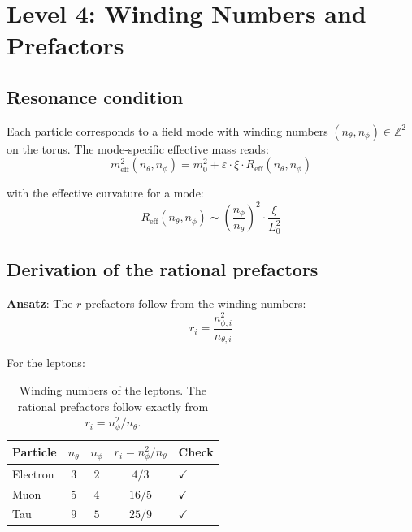 \section{Level 4: Winding Numbers and Prefactors}

\subsection{Resonance condition}

Each particle corresponds to a field mode with winding numbers
$(n_\theta, n_\phi) \in \mathbb{Z}^2$ on the torus. The
mode-specific effective mass reads:
\begin{equation}
    m_{\mathrm{eff}}^2(n_\theta, n_\phi)
    = m_0^2 + \varepsilon \cdot \xi \cdot R_{\mathrm{eff}}(n_\theta, n_\phi)
\end{equation}

with the effective curvature for a mode:
\begin{equation}
    R_{\mathrm{eff}}(n_\theta, n_\phi)
    \sim \left(\frac{n_\phi}{n_\theta}\right)^2 \cdot \frac{\xi}{L_0^2}
\end{equation}

\subsection{Derivation of the rational prefactors}

\textbf{Ansatz}: The $r$ prefactors follow from the winding numbers:
\begin{equation}
    \boxed{r_i = \frac{n_{\phi,i}^2}{n_{\theta,i}}}
    \label{eq:r_winding}
\end{equation}

For the leptons:

\begin{table}[htbp]
\centering
\begin{tabular}{lcccl}
\toprule
\textbf{Particle} & $n_\theta$ & $n_\phi$ & $r_i = n_\phi^2/n_\theta$
& \textbf{Check} \\
\midrule
Electron & $3$ & $2$ & $4/3$  & $\checkmark$ \\
Muon     & $5$ & $4$ & $16/5$ & $\checkmark$ \\
Tau      & $9$ & $5$ & $25/9$ & $\checkmark$ \\
\bottomrule
\end{tabular}
\caption{Winding numbers of the leptons. The rational prefactors follow
exactly from $r_i = n_\phi^2 / n_\theta$.}
\label{tab:lepton_winding}
\end{table}

